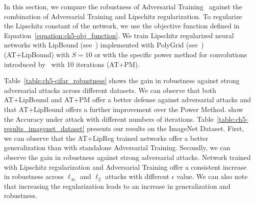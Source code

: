 In this section, we compare the robustness of Adversarial Training~\cite{goodfellow2014explaining, madry2018towards} against the combination of Adversarial Training and Lipschitz regularization.
To regularize the Lipschitz constant of the network, we use the objective function defined in Equation~\ref{equation:ch5-obj_function}.
We train Lipschitz regularized neural networks with LipBound (see~) implemented with PolyGrid (see~) (AT+LipBound) with $S = 10$ or with the specific power method for convolutions introduced by~\citet{farnia2018generalizable} with 10 iterations (AT+PM).

Table~\ref{table:ch5-cifar_robustness} shows the gain in robustness against strong adversarial attacks across different datasets.
We can observe that both AT+LipBound and AT+PM offer a better defense against adversarial attacks and that AT+LipBound offers a further improvement over the Power Method.
 show the Accuracy under attack with different numbers of iterations.
Table~\ref{table:ch5-results_imagenet_dataset} presents our results on the ImageNet Dataset.
First, we can observe that the AT+LipReg trained networks offer a better generalization than with standalone Adversarial Training.
Secondly, we can observe the gain in robustness against strong adversarial attacks.
Network trained with Lipschitz regularization and Adversarial Training offer a consistent increase in robustness across $\ell_\infty$ and $\ell_2$ attacks with different $\epsilon$ value.
We can also note that increasing the regularization leads to an increase in generalization and robustness.

